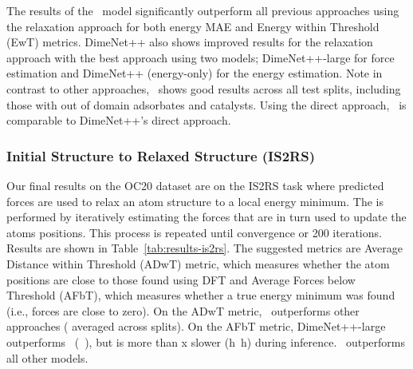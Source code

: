 The results of the \model~model significantly outperform all previous approaches using the relaxation approach for both energy MAE and Energy within Threshold (EwT) metrics. DimeNet++ also shows improved results for the relaxation approach with the best approach using two models; DimeNet++-large for force estimation and DimeNet++ (energy-only) for the energy estimation. Note in contrast to other approaches, \model~shows good results across all test splits, including those with out of domain adsorbates and catalysts. Using the direct approach, \model~is comparable to DimeNet++'s direct approach. 






\subsubsection{Initial Structure to Relaxed Structure (IS2RS)}

Our final results on the OC20 dataset are on the IS2RS task where predicted forces are used to relax an atom structure to a local energy minimum. The is performed by iteratively estimating the forces that are in turn used to update the atoms positions. This process is repeated until convergence or 200 iterations. Results are shown in Table~\ref{tab:results-is2rs}. The suggested metrics are  Average Distance within Threshold (ADwT) metric, which measures whether the atom positions are close to those found using DFT
and Average Forces below Threshold (AFbT), which measures whether a true energy minimum was found (i.e., forces are close to zero). On the ADwT metric, \model~outperforms other approaches ( averaged across splits).
On the AFbT metric, DimeNet++-large outperforms \model~(~\vs ),
but is more than x slower (h~\vs h) during inference. \model~outperforms all other models.

